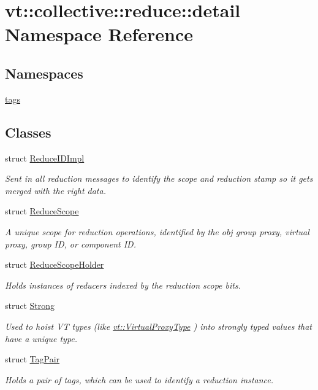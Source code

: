 \hypertarget{namespacevt_1_1collective_1_1reduce_1_1detail}{}\section{vt\+:\+:collective\+:\+:reduce\+:\+:detail Namespace Reference}
\label{namespacevt_1_1collective_1_1reduce_1_1detail}
\subsection*{Namespaces}
\begin{DoxyCompactItemize}
\item 
 \hyperlink{namespacevt_1_1collective_1_1reduce_1_1detail_1_1tags}{tags}
\end{DoxyCompactItemize}
\subsection*{Classes}
\begin{DoxyCompactItemize}
\item 
struct \hyperlink{structvt_1_1collective_1_1reduce_1_1detail_1_1_reduce_i_d_impl}{Reduce\+I\+D\+Impl}
\begin{DoxyCompactList}\small\item\em Sent in all reduction messages to identify the scope and reduction stamp so it gets merged with the right data. \end{DoxyCompactList}\item 
struct \hyperlink{structvt_1_1collective_1_1reduce_1_1detail_1_1_reduce_scope}{Reduce\+Scope}
\begin{DoxyCompactList}\small\item\em A unique scope for reduction operations, identified by the obj group proxy, virtual proxy, group ID, or component ID. \end{DoxyCompactList}\item 
struct \hyperlink{structvt_1_1collective_1_1reduce_1_1detail_1_1_reduce_scope_holder}{Reduce\+Scope\+Holder}
\begin{DoxyCompactList}\small\item\em Holds instances of reducers indexed by the reduction scope bits. \end{DoxyCompactList}\item 
struct \hyperlink{structvt_1_1collective_1_1reduce_1_1detail_1_1_strong}{Strong}
\begin{DoxyCompactList}\small\item\em Used to hoist VT types (like {\ttfamily \hyperlink{namespacevt_a1b417dd5d684f045bb58a0ede70045ac}{vt\+::\+Virtual\+Proxy\+Type}} ) into strongly typed values that have a unique type. \end{DoxyCompactList}\item 
struct \hyperlink{structvt_1_1collective_1_1reduce_1_1detail_1_1_tag_pair}{Tag\+Pair}
\begin{DoxyCompactList}\small\item\em Holds a pair of tags, which can be used to identify a reduction instance. \end{DoxyCompactList}\end{DoxyCompactItemize}
